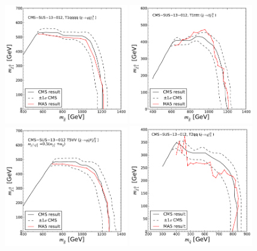  \begin{figure}
        \centering
        \includegraphics[width=0.48\textwidth]{figures/Appendices/Ma5ValidationSUS13012/cms-012-limit-T1qqqq.pdf}
        \includegraphics[width=0.48\textwidth]{figures/Appendices/Ma5ValidationSUS13012/cms-012-limit-T1tttt.pdf}\\
        \includegraphics[width=0.48\textwidth]{figures/Appendices/Ma5ValidationSUS13012/cms-012-limit-T5VV.pdf}
        \includegraphics[width=0.48\textwidth]{figures/Appendices/Ma5ValidationSUS13012/cms-012-limit-T2qq.pdf}

\end{figure}

